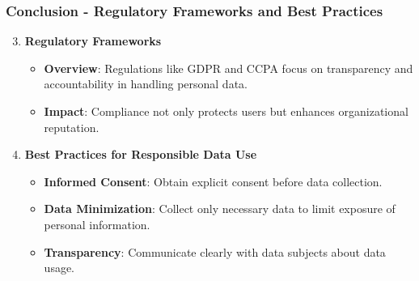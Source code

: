\documentclass{beamer}
\begin{document}
\begin{frame}[fragile]
    \frametitle{Conclusion - Regulatory Frameworks and Best Practices}
    
    \begin{enumerate}
        \setcounter{enumi}{2}
        \item \textbf{Regulatory Frameworks}
        \begin{itemize}
            \item \textbf{Overview}: Regulations like GDPR and CCPA focus on transparency and accountability in handling personal data.
            \item \textbf{Impact}: Compliance not only protects users but enhances organizational reputation.
        \end{itemize}
        
        \item \textbf{Best Practices for Responsible Data Use}
        \begin{itemize}
            \item \textbf{Informed Consent}: Obtain explicit consent before data collection.
            \item \textbf{Data Minimization}: Collect only necessary data to limit exposure of personal information.
            \item \textbf{Transparency}: Communicate clearly with data subjects about data usage.
        \end{itemize}
    \end{enumerate}
\end{frame}
\end{document}
